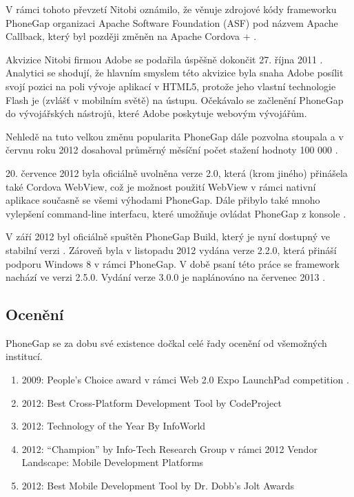 V rámci tohoto převzetí Nitobi oznámilo, že věnuje zdrojové kódy frameworku PhoneGap organizaci Apache Software Foundation (ASF) pod názvem Apache Callback, který byl později změněn na Apache Cordova \cite{nitobi_adobe2} + \cite{phonegap_13_released}. 

Akvizice Nitobi firmou Adobe se podařila úspěšně dokončit 27. října 2011 \cite{nitobi_adobe2}. Analytici se shodují, že hlavním smyslem této akvizice byla snaha Adobe posílit svojí pozici na poli vývoje aplikací v HTML5, protože jeho vlastní technologie Flash je (zvlášť v mobilním světě) na ústupu. Očekávalo se začlenění PhoneGap do vývojářských nástrojů, které Adobe poskytuje webovým vývojářům.

Nehledě na tuto velkou změnu popularita PhoneGap dále pozvolna stoupala a v červnu roku 2012 dosahoval průměrný měsíční počet stažení hodnoty 100 000 \cite{phonegap_myths}.

20. července 2012 byla oficiálně uvolněna verze 2.0, která (krom jiného) přinášela také Cordova WebView, což je možnost použití WebView v rámci nativní aplikace současně se všemi výhodami PhoneGap. Dále přibylo také mnoho vylepšení command-line interfacu, které umožňuje ovládat PhoneGap z konsole \cite{phonegap_2_released}. 

V září 2012 byl oficiálně spuštěn PhoneGap Build, který je nyní dostupný ve stabilní verzi \cite{phonegap_build_launched}. Zároveň byla v listopadu 2012 vydána verze 2.2.0, která přináší podporu Windows 8 v rámci PhoneGap. V době psaní této práce se framework nachází ve verzi 2.5.0. Vydání verze 3.0.0 je naplánováno na červenec 2013 \cite{cordova_roadmapprojects}. 

\subsection{Ocenění}
PhoneGap se za dobu své existence dočkal celé řady ocenění od všemožných institucí.

\begin{enumerate}
	\item 2009: People’s Choice award v rámci Web 2.0 Expo LaunchPad competition \cite{phonegap_winning_webexpo}. 
	\item 2012: Best Cross-Platform Development Tool by CodeProject \cite{phonegap_best_xplatfrom_tool}
	\item 2012: Technology of the Year By InfoWorld \cite{infoworld_technology_of_2012}
	\item 2012: “Champion” by Info-Tech Research Group v rámci 2012 Vendor Landscape: Mobile Development Platforms \cite{phonegap_champion}
	\item 2012: Best Mobile Development Tool by Dr. Dobb's Jolt Awards \cite{phonegap_best_mobile_dev_tool}
\end{enumerate}

